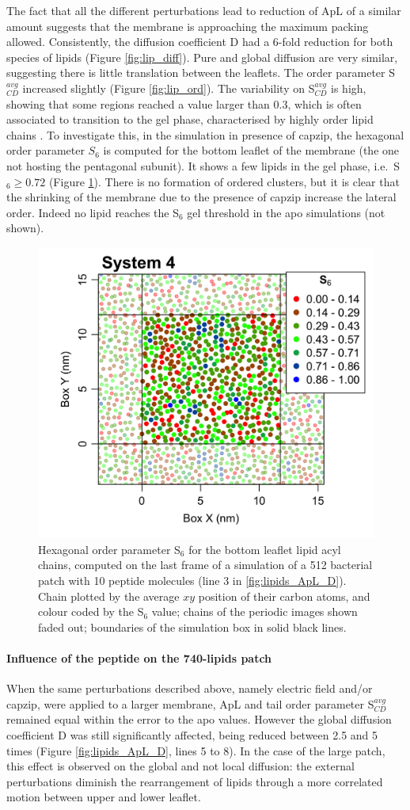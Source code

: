 The fact that all the different perturbations lead to reduction of ApL of a similar amount suggests that the membrane is approaching the maximum packing allowed.
%
Consistently, the diffusion coefficient D had a 6-fold reduction for both species of lipids (Figure \ref{fig:lip_diff}). Pure and global diffusion are very similar, suggesting there is little translation between the leaflets.
%
The order parameter S$^{avg}_{CD}$ increased slightly (Figure \ref{fig:lip_ord}). The variability on S$^{avg}_{CD}$ is high, showing that some regions reached a value larger than 0.3, which is often associated to transition to the gel phase, characterised by highly order lipid chains \citep{Pluhackova2016}.
%
To investigate this, in the simulation in presence of capzip, the hexagonal order parameter $S_6$ is computed for the bottom leaflet of the membrane (the one not hosting the pentagonal subunit). It shows a few lipids in the gel phase, i.e.\ S$_6 \ge 0.72$ (Figure \ref{fig:S6_pb4}). There is no formation of ordered clusters, but it is clear that the shrinking of the membrane due to the presence of capzip increase the lateral order. Indeed no lipid reaches the S$_6$ gel threshold in the apo simulations (not shown).
%
\begin{figure}[h!]
\centering
\includegraphics[width=0.5\linewidth]{3results_capsule/pics/pb4_S6.png} 
\caption[Hexagonal order parameter of lipids in protein-lipid simulation]{Hexagonal order parameter S$_6$ for the bottom leaflet lipid acyl chains, computed on the last frame of a simulation of a 512 bacterial patch with 10 peptide molecules (line 3 in \ref{fig:lipids_ApL_D}). Chain plotted by the average $xy$ position of their carbon atoms, and colour coded by the S$_6$ value; chains of the periodic images shown faded out; boundaries of the simulation box in solid black lines.}
\label{fig:S6_pb4}
\end{figure}

\paragraph{Influence of the peptide on the 740-lipids patch} When the same perturbations described above, namely electric field and/or capzip, were applied to a larger membrane, ApL and tail order parameter S$^{avg}_{CD}$ remained equal within the error to the apo values. However the global diffusion coefficient D was still significantly affected, being reduced between 2.5 and 5 times (Figure \ref{fig:lipids_ApL_D}, lines 5 to 8).
%
In the case of the large patch, this effect is observed on the global and not local diffusion: the external perturbations diminish the rearrangement of lipids through a more correlated motion between upper and lower leaflet.


